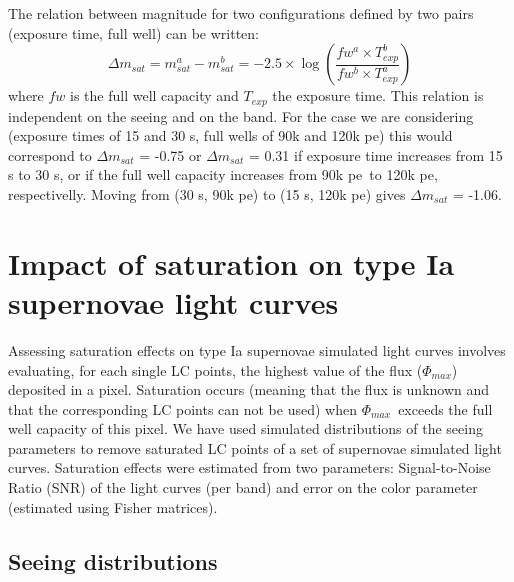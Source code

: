 \documentclass[\docopts]{\docclass}
\newcommand{\pe}{{pe}}
\newcommand{\phimax}{{$\Phi_{max}$}}
\begin{document}
The relation between magnitude for two configurations defined by two pairs (exposure time, full well) can be written:
\begin{equation}
\Delta m_{sat} = m^a_{sat}-m^b_{sat} = -2.5 \times \log\left(\frac{fw^a\times T_{exp}^b}{fw^b \times T_{exp}^a}\right)
 \end{equation}
where $fw$ is the full well capacity and $T_{exp}$ the exposure time. This relation is independent on the seeing and on the band. For the case we are considering (exposure times of 15 and 30 s, full wells of 90k and 120k \pe) this would correspond to  $\Delta m_{sat}$ = -0.75 or $\Delta m_{sat}$ = 0.31 if exposure time increases from 15 s to 30 s, or if the full well capacity increases from 90k \pe~to 120k \pe, respectivelly.  Moving from (30 s, 90k \pe) to (15 s, 120k \pe) gives $\Delta m_{sat}$ = -1.06. 




\section{Impact of saturation on type Ia supernovae light curves}
\label{sec:sn_saturation}
Assessing saturation effects on type Ia supernovae simulated light curves involves evaluating, for each single LC points, the highest value of the flux (\phimax) deposited in a pixel. Saturation occurs (meaning that the flux is unknown and that the corresponding LC points can not be used) when \phimax~exceeds the full well capacity of this pixel. We have used simulated distributions of the seeing parameters to remove saturated LC points of a set of supernovae simulated light curves. Saturation effects were  estimated from two parameters: Signal-to-Noise Ratio (SNR) of the light curves (per band) and error on the color parameter (estimated using Fisher matrices).

\subsection{Seeing distributions}
\end{document}
